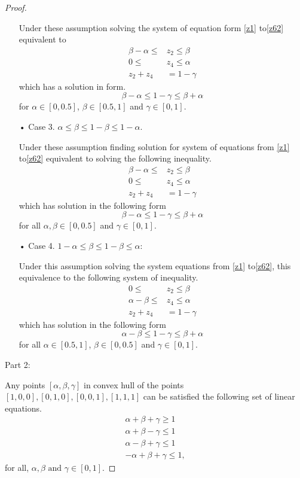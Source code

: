 \begin{proof}
\begin{itemize}
Under these assumption solving the system of equation form  \ref{z1} to\ref{z62} equivalent to 
\begin{align*}
\beta-\alpha \leq &z_2 \leq \beta\\
0 \leq &z_4 \leq \alpha\\
z_2+z_4&=1-\gamma
\end{align*}
which has a solution in form.
\begin{equation}
\beta-\alpha \leq1-\gamma \leq \beta+\alpha
\end{equation}
for $\alpha \in [0,0.5]$, $\beta\in [0.5,1]$ and $\gamma \in [0,1]$.


\item[• Case 3.] $\alpha\leq \beta \leq 1-\beta \leq 1-\alpha$.

Under these assumption finding solution for system of equations from \ref{z1} to\ref{z62} equivalent to solving the following inequality.
\begin{align*}
\beta-\alpha \leq &z_2 \leq \beta\\
0 \leq &z_4 \leq \alpha\\
z_2+z_4&=1-\gamma
\end{align*}
which has solution in the following form
\begin{equation}\label{case3 p1}
\beta-\alpha \leq1-\gamma \leq \beta+\alpha
\end{equation}
for all $\alpha,\beta \in [0,0.5]$ and $\gamma \in [0,1]$.

\item[• Case 4.] $1-\alpha\leq  \beta \leq 1-\beta \leq \alpha$:

Under this assumption solving the system equations from \ref{z1} to\ref{z62}, this equivalence to the following system of inequality.
\begin{align*}
0 \leq &z_2 \leq \beta\\
 \alpha-\beta \leq &z_4 \leq \alpha\\
z_2+z_4&=1-\gamma
\end{align*}
which has solution in the following form
\begin{equation}
\alpha-\beta \leq1-\gamma \leq \beta+\alpha
\end{equation}
for all $\alpha \in [0.5,1]$, $\beta \in [0,0.5]$ and  $\gamma \in [0,1]$.
\end{itemize}

Part 2:

Any points $[\alpha,\beta,\gamma]$ in convex hull of the points $[1, 0, 0], [0, 1, 0], [0, 0, 1], [1, 1, 1]$ can be satisfied the following set of linear equations.
\begin{align}
\alpha+\beta+\gamma \geq 1\label{con1}\\
\alpha+\beta-\gamma \leq 1\label{con2}\\
\alpha-\beta+\gamma \leq 1\label{con3}\\
-\alpha+\beta+\gamma \leq 1\label{con4},
\end{align}
for all, $ \alpha, \beta \text{ and }\gamma \in [0,1]$.


\end{proof}
